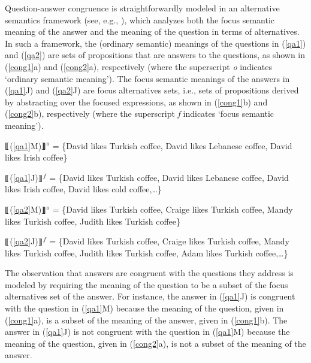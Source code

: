\documentclass[11pt,fleqn]{article}
\newcommand{\6}{\mbox{$[\hspace*{-.6mm}[$}}
\newcommand{\9}{\mbox{$]\hspace*{-.6mm}]$}}
\newcommand{\sem}[2]{\6#1\9$^{#2}$}
\begin{document}
Question-answer congruence is straightforwardly modeled in an
alternative semantics framework (see, e.g., \citealt{rooth85,rooth92}), which
analyzes both the focus semantic meaning of the answer and the meaning of
the question in terms of alternatives. In such a framework, the (ordinary semantic) meanings
of the questions in (\ref{qa1}) and (\ref{qa2}) are sets of propositions
that are answers to the questions, as shown in (\ref{cong1}a) and
(\ref{cong2}a), respectively (where the superscript {\em o} indicates `ordinary semantic meaning'). The focus
semantic meanings of the answers in (\ref{qa1}J) and (\ref{qa2}J) are
focus alternatives sets, i.e., sets of propositions derived by
abstracting over the focused expressions, as shown in (\ref{cong1}b) and
(\ref{cong2}b), respectively (where the superscript {\em f} indicates `focus semantic meaning').

\begin{exe}
\ex\label{cong1}

\begin{xlist}

\ex \sem{(\ref{qa1}M)}{o} = \{David likes Turkish coffee, David likes Lebanese coffee, David likes Irish coffee\}

\ex \sem{(\ref{qa1}J)}{f} = \{David likes Turkish coffee, David likes Lebanese coffee, David likes Irish coffee, David likes cold coffee,\ldots\} 

\end{xlist}

\ex\label{cong2}

\begin{xlist}

\ex \sem{(\ref{qa2}M)}{o} = \{David likes Turkish coffee, Craige likes Turkish coffee, Mandy likes Turkish coffee, Judith likes Turkish coffee\}

\ex \sem{(\ref{qa2}J)}{f} = \{David likes Turkish coffee, Craige likes Turkish coffee, Mandy likes Turkish coffee, Judith likes Turkish coffee, Adam likes Turkish coffee,\ldots\}

\end{xlist}

\end{exe} The observation that answers are congruent with the questions
they address is modeled by requiring the meaning of the question to be a
subset of the focus alternatives set of the answer. For instance, the
answer in (\ref{qa1}J) is congruent with the question in (\ref{qa1}M)
because the meaning of the question, given in (\ref{cong1}a), is a
subset of the meaning of the answer, given in (\ref{cong1}b). The
answer in (\ref{qa1}J) is not congruent with the question in
(\ref{qa1}M) because the meaning of the question, given in
(\ref{cong2}a), is not a subset of the meaning of the answer. 
\end{document}
